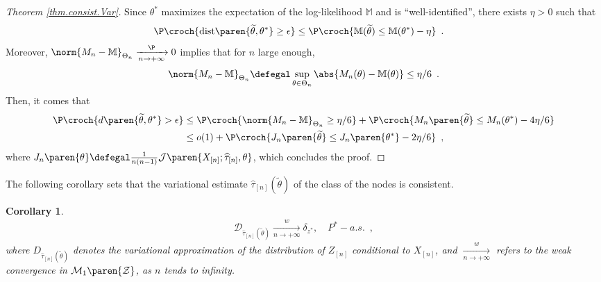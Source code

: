 \documentclass[11pt]{article}
\newtheorem{proof}{Proof}%
\newtheorem{cor}[thm]{Corollary}
\newcommand{\Xn}{X_{[n]}}
\newcommand{\Zn}{Z_{[n]}}
\newcommand{\J}{\mathcal{J}}
\newcommand{\tah}{\widehat{\tau}}
\newcommand{\tahn}{\tah_{[n]}}
\begin{document}
\begin{proof}[Theorem \ref{thm.consist.Var}]
Since $\theta^*$ maximizes the expectation of the log-likelihood $\mathbb{M}$ and is ``well-identified'', there exists $\eta>0$ such that
        \begin{align*}
\P\croch{\mathrm{dist}\paren{\widetilde{\theta},\theta^*}\geq \epsilon} & \leq
        \P\croch{\mathbb{M}(\widetilde{\theta})\leq \mathbb{M}(\theta^*)-\eta}\enspace.
        \end{align*}
Moreover, $\norm{M_n-\mathbb{M}}_{\Theta_n}\xrightarrow[n\to +\infty]{\P}0$ implies that for $n$ large enough,
\begin{align*}
        \norm{M_n-\mathbb{M}}_{\Theta_n} \defegal \sup_{\theta\in\Theta_n} \abs{M_n(\theta)-\mathbb{M}(\theta)} \leq \eta/6\enspace.
\end{align*}
Then, it comes that
\begin{align*}
        \P\croch{d\paren{\widetilde{\theta},\theta^*}>\epsilon} & \leq \P\croch{\norm{M_n-\mathbb{M}}_{\Theta_n}\geq \eta/6}  + \P\croch{M_n\paren{\widetilde{\theta}}\leq M_n(\theta^*)-4\eta/6}\\
 & \leq o(1) + \P\croch{J_n\paren{\widetilde{\theta}}
\leq J_n\paren{\theta^*}-2\eta/6}
\enspace,
\end{align*}
where $J_n\paren{\theta} \defegal \frac{1}{n(n-1)}\J\paren{\Xn; \tahn, \theta}$,
which concludes the proof.
        
\end{proof}
The following corollary sets that the variational estimate $\tahn(\widetilde{\theta})$ of the class of the nodes is consistent.
\begin{cor}\label{cor.conv.taun}
\begin{align*}
        \mathcal{D}_{\tahn(\widetilde{\theta})} \xrightarrow[n\to+\infty]{w} \delta_{z^*},\quad P^*-a.s.\enspace,
\end{align*}
where $D_{\tahn(\widetilde{\theta})}$  denotes the variational approximation of the distribution of $\Zn$ conditional to $\Xn$, and $\xrightarrow[n\to+\infty]{w}$ refers to the weak convergence in $\mathcal {M}_1\paren{\mathcal{Z}}$, as $n$ tends to infinity.
\end{cor}
\end{document}
